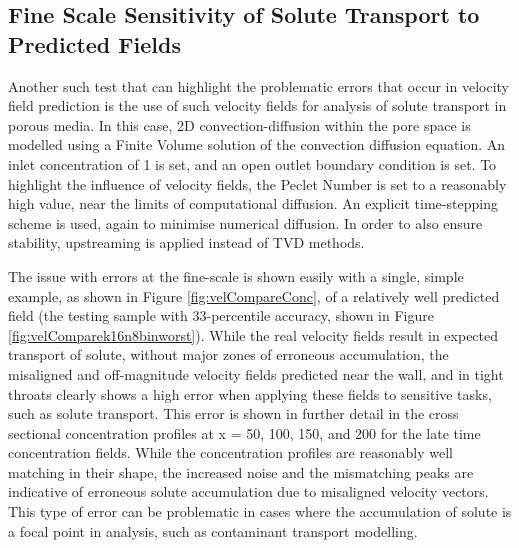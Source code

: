 \documentclass{article}
\begin{document}
\subsection{Fine Scale Sensitivity of Solute Transport to Predicted Fields}
\label{sec:2Dconvdiff}
Another such test that can highlight the problematic errors that occur in velocity field prediction is the use of such velocity fields for analysis of solute transport in porous media. In this case, 2D convection-diffusion within the pore space is modelled using a Finite Volume solution of the convection diffusion equation. An inlet concentration of 1 is set, and an open outlet boundary condition is set. To highlight the influence of velocity fields, the Peclet Number is set to a reasonably high value, near the limits of computational diffusion. An explicit time-stepping scheme is used, again to minimise numerical diffusion. In order to also ensure stability, upstreaming is applied instead of TVD methods. 

The issue with errors at the fine-scale is shown easily with a single, simple example, as shown in Figure \ref{fig:velCompareConc}, of a relatively well predicted field (the testing sample with 33-percentile accuracy, shown in Figure \ref{fig:velComparek16n8binworst}). While the real velocity fields result in expected transport of solute, without major zones of erroneous accumulation, the misaligned and off-magnitude velocity fields predicted near the wall, and in tight throats clearly shows a high error when applying these fields to sensitive tasks, such as solute transport. This error is shown in further detail in the cross sectional concentration profiles at x = 50, 100, 150, and 200 for the late time concentration fields. While the concentration profiles are reasonably well matching in their shape, the increased noise and the mismatching peaks are indicative of erroneous solute accumulation due to misaligned velocity vectors. This type of error can be problematic in cases where the accumulation of solute is a focal point in analysis, such as contaminant transport modelling.
\end{document}
